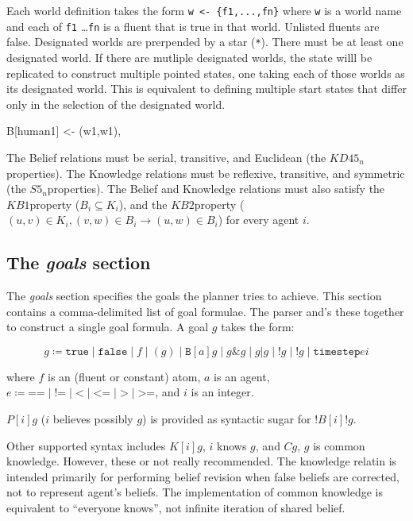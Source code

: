 \documentclass{article}
\newcommand{\kdff}{\ensuremath{KD45_n}}
\newcommand{\sfive}{\ensuremath{S5_n}}
\newcommand{\kbone}{\ensuremath{KB1}}
\newcommand{\kbtwo}{\ensuremath{KB2}}
\begin{document}
Each world definition takes the form
\verb|w <- {f1,...,fn}|
where \verb|w| is a world name
and each of \verb|f1| \ldots \verb|fn| is a fluent 
that is true in that world. Unlisted fluents are false.
Designated worlds are prerpended by a star (\verb|*|).
There must be at least one designated world. 
If there are mutliple designated worlds, the state willl be replicated to
construct multiple pointed states, one taking each of those worlds as its
designated world. This is equivalent to defining multiple start states that
differ only in the selection of the designated world.

B[human1] <- {(w1,w1)},

The Belief relations must be serial, transitive, and Euclidean (the \kdff
properties). The Knowledge relations must be reflexive, transitive, and
symmetric (the \sfive properties). The Belief and Knowledge relations must also
satisfy the \kbone property ($B_i \subseteq K_i$), and the \kbtwo property
($(u,v) \in K_i, (v,w) \in B_i \rightarrow (u,w) \in B_i$) for every agent
$i$.



\subsection{The \emph{goals} section}

The \emph{goals} section specifies the goals the planner tries to achieve.
This section contains a comma-delimited list of goal formulae. The parser and's
these together to construct a single goal formula. A goal $g$ takes the form:

$$
g \coloneq
\texttt{true}      \mid
\texttt{false}     \mid
f         \mid
(g)       \mid
\texttt{B}[a]g     \mid
g \& g     \mid
g | g     \mid
!g        \mid
!g        \mid
\texttt{timestep} e i
$$

\noindent
where $f$ is an (fluent or constant) atom, $a$ is an agent, 
$e \coloneq
\texttt{==} \mid
\texttt{!=} \mid
\texttt{<} \mid
\texttt{<=} \mid
\texttt{>} \mid
\texttt{>=}
$, and $i$ is an integer.

$P[i]g$ ($i$ believes possibly $g$) is provided as syntactic sugar for
$!B[i]!g$.

Other supported syntax includes $K[i]g$, $i$ knows $g$, and $Cg$, $g$ is common
knowledge. However, these or not really recommended. The knowledge relatin is
intended primarily for performing belief revision when false beliefs are
corrected, not to represent agent's beliefs. The implementation of common
knowledge is equivalent to ``everyone knows'', not infinite iteration of shared
belief.
\end{document}
